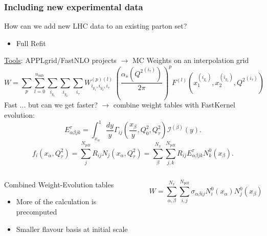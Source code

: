 \documentclass[10pt]{beamer}
\newcommand{\be}{\begin{equation*}}
\newcommand{\ee}{\end{equation*}}
\newcommand{\nsub}{n_\mathrm{sub}}
\begin{document}
\begin{frame}
\frametitle{Including new experimental data}
How can we add new LHC data to an existing parton set?

\begin{itemize}
		\item<1-> Full Refit\\
\end{itemize}
\underline{Tools}: APPLgrid/FastNLO projects $\to$ MC Weights on an interpolation grid
\be W = \sum_p \sum_{l=0}^{\nsub} \sum_{i_{y_1}} \sum_{i_{y_2}} \sum_{i_\tau}
W_{i_{y_1},i_{y_2},i_\tau}^{(p)(l)} \, \left( \frac{\alpha_s\left({Q^2}^{(i_\tau)}\right)}{2\pi}\right)^{p}
F^{(l)}\left(x_1^{(i_{y_1})}, x_2^{(i_{y_1})},  {Q^2}^{(i_\tau)}\right)
\ee
Fast ... but can we get faster? $\to$ combine weight tables with FastKernel evolution:
\be E^\tau_{\alpha\beta j k} = \int_{x_\alpha}^1 \frac{dy}{y}\Gamma_{ij}\left( \frac{x_\beta}{y},Q_0^2,Q_\tau^2 \right) \mathcal{I}^{(\beta)}(y). \ee
\be f_i(x_{\alpha},Q^2_\tau) =  \sum_j^{N_{\mathrm{pdf}}}R_{ij}N_j(x_{\alpha},Q_\tau^2) = \sum_{\beta}^{N_x}  \sum_{j,k}^{N_{\mathrm{pdf}}} R_{ij}E^\tau_{\alpha\beta jk}N^0_k(x_\beta).\ee 

\begin{columns}
  \begin{column}{0.6\textwidth}
Combined Weight-Evolution tables
\begin{itemize}
		\item<1-> More of the calculation is precomputed\\
		\item<1-> Smaller flavour basis at initial scale\\
\end{itemize}  \end{column}
    \begin{column}{0.4\textwidth}
  \be W= \sum_{\alpha,\beta}^{N_x}\sum_{i,j}^{N_{\mathrm{pdf}}} \sigma_{\alpha\beta i j}N_i^0(x_\alpha)N_j^0(x_\beta)\ee

	  \end{column}
  \end{columns}


  
  
\end{frame}
\end{document}
